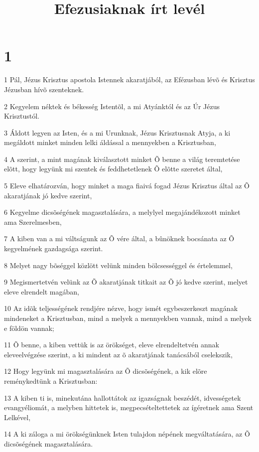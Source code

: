 

\title{Efezusiaknak írt levél}


\chapter{1}

\par 1 Pál, Jézus Krisztus apostola Istennek akaratjából, az Efézusban lévõ és Krisztus Jézusban hívõ szenteknek.
\par 2 Kegyelem néktek és békesség Istentõl, a mi Atyánktól és az Úr Jézus Krisztustól.
\par 3 Áldott legyen az Isten, és a mi Urunknak, Jézus Krisztusnak Atyja, a ki megáldott minket minden lelki áldással a mennyekben a Krisztusban,
\par 4 A szerint, a mint magának kiválasztott minket Õ benne a világ teremtetése elõtt, hogy legyünk mi szentek és feddhetetlenek Õ elõtte szeretet által,
\par 5 Eleve elhatározván, hogy minket a maga fiaivá fogad Jézus Krisztus által az Õ akaratjának jó kedve szerint,
\par 6 Kegyelme dicsõségének magasztalására, a melylyel megajándékozott minket ama Szerelmesben,
\par 7 A kiben van a mi váltságunk az Õ vére által, a bûnöknek bocsánata az Õ kegyelmének gazdagsága szerint.
\par 8 Melyet nagy bõséggel közlött velünk minden bölcsességgel és értelemmel,
\par 9 Megismertetvén velünk az Õ akaratjának titkait az Õ jó kedve szerint, melyet eleve elrendelt magában,
\par 10 Az idõk teljességének rendjére nézve, hogy ismét egybeszerkeszt magának mindeneket a Krisztusban, mind a melyek a mennyekben vannak, mind a melyek e földön vannak;
\par 11 Õ benne, a kiben vettük is az örökséget, eleve elrendeltetvén annak eleveelvégzése szerint, a ki mindent az õ akaratjának tanácsából cselekszik,
\par 12 Hogy legyünk mi magasztalására az Õ dicsõségének, a kik elõre reménykedtünk a Krisztusban:
\par 13 A kiben ti is, minekutána hallottátok az igazságnak beszédét, idvességetek evangyéliomát, a melyben hittetek is, megpecsételtettetek az ígéretnek ama Szent Lelkével,
\par 14 A ki záloga a mi örökségünknek Isten tulajdon népének megváltatására, az Õ dicsõségének magasztalására.

